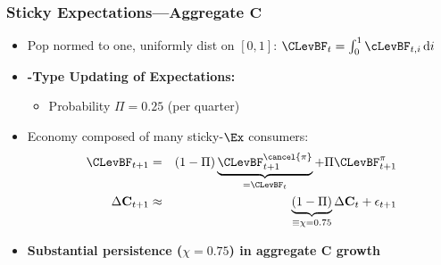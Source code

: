 \documentclass{beamer}\usepackage{dcolumn}
\newcommand{\jbemph}[1]{\textbf{\color{SlideNavy}#1}}
\begin{document}
\begin{frame}
\frametitle{Sticky Expectations---Aggregate $\mathbf{C}$}

\begin{itemize}
\setlength{\itemsep}{2mm}
\item Pop normed to one, uniformly dist on $[0,1]$:
$\CLevBF_{t} = \int_{0}^{1} \cLevBF_{t,i}\,\text{d}i$

\item \jbemph{\cite{calvoPrices}-Type Updating of Expectations:}
\begin{itemize}
\item Probability $\Pi = 0.25$ (per quarter)
\end{itemize}

\item Economy composed of many sticky-$\Ex$ consumers:
\begin{eqnarray*}
 \CLevBF_{t+1} & = & (1-\Pi) \underbrace{\CLevBF^{\cancel{{\pi}}}_{t+1}}_{=\CLevBF_{t}} \label{eq:Ctp1} + \Pi \CLevBF^{{\pi}}_{t+1}
 \\
  \Delta \mathbf{C}_{t+1} & \approx & \underbrace{(1-\Pi)}_{{}\equiv\chi=0.75} \Delta \mathbf{C}_{t} + \epsilon_{t+1}
\end{eqnarray*}
\item \jbemph{Substantial persistence ($\chi=0.75$) in aggregate C growth}
\end{itemize}
\end{frame}
\end{document}
